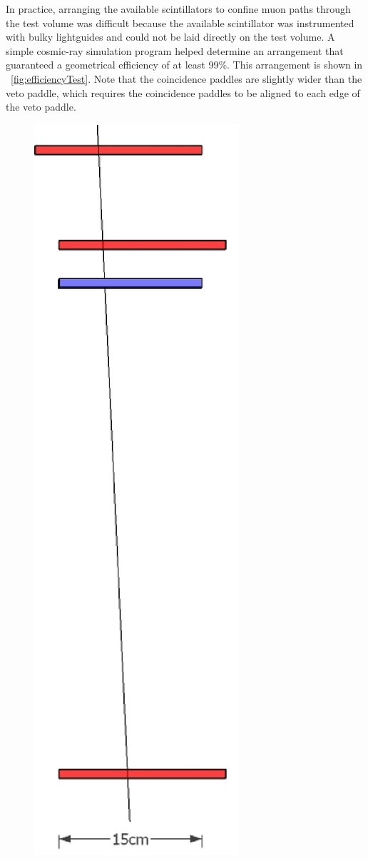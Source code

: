 In practice, arranging the available scintillators to confine muon paths through the test volume was difficult because the available scintillator was instrumented with bulky lightguides and could not be laid directly on the test volume.  A simple cosmic-ray simulation program helped determine an arrangement that guaranteed a geometrical efficiency of at least 99\%.  This arrangement is shown in {\fig}~\ref{fig:efficiencyTest}.  Note that the coincidence paddles are slightly wider than the veto paddle, which requires the coincidence paddles to be aligned to each edge of the veto paddle.  
\begin{figure}[!htbp]
\centering
\includegraphics[height=0.4\textheight]{figures/veto_test.eps}

\end{figure}
